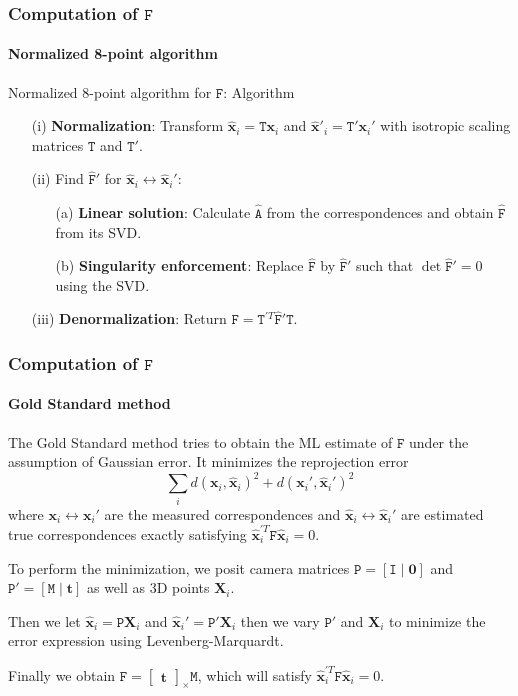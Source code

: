 \documentclass[aspectratio=169]{beamer}
\renewcommand{\vec}[1]{\boldsymbol{#1}}
\newcommand{\mat}[1]{\mathtt{#1}}
\newcommand{\crossmat}[1]{\begin{bmatrix} #1 \end{bmatrix}_{\times}}
\begin{document}
\begin{frame}
\frametitle{Computation of $\mat{F}$}
\framesubtitle{Normalized 8-point algorithm}

\begin{block}{Normalized 8-point algorithm for $\mat{F}$: Algorithm}
\begin{itemize}
\item[(i)] {\bf Normalization}: Transform
  $\hat{\vec{x}}_i=\mat{T}\vec{x}_i$ and
  $\hat{\vec{x}}'_i=\mat{T}'\vec{x}_i'$ with isotropic scaling
  matrices $\mat{T}$ and $\mat{T}'$.
\item[(ii)] Find $\hat{\mat{F}}'$ for $\hat{\vec{x}}_i \leftrightarrow
  \hat{\vec{x}}_i'$:
  \begin{itemize}
  \item[(a)] {\bf Linear solution}: Calculate $\hat{\mat{A}}$ from the
    correspondences and obtain $\hat{\mat{F}}$ from its SVD.
  \item[(b)] {\bf Singularity enforcement}: Replace $\hat{\mat{F}}$ by
    $\hat{\mat{F}}'$ such that $\det \hat{\mat{F}}'=0$ using the SVD.
  \end{itemize}
\item[(iii)] {\bf Denormalization}: Return $\mat{F}=\mat{T}^{\prime
  T}\hat{\mat{F}}'\mat{T}$.
\end{itemize}
\end{block}

\end{frame}

\begin{frame}
\frametitle{Computation of $\mat{F}$}
\framesubtitle{Gold Standard method}

The Gold Standard method tries to obtain the ML estimate of $\mat{F}$
under the assumption of Gaussian error.  It minimizes the \alert{reprojection
error}
\begin{equation*}
\sum_i d(\vec{x}_i,\hat{\vec{x}}_i)^2+d(\vec{x}_i',\hat{\vec{x}}_i')^2
\end{equation*}
where $\vec{x}_i \leftrightarrow \vec{x}_i'$ are the measured
correspondences and $\hat{\vec{x}}_i \leftrightarrow \hat{\vec{x}}_i'$ are
estimated true correspondences \alert{exactly satisfying}
$\hat{\vec{x}}_i^{\prime T}\mat{F}\hat{\vec{x}}_i = 0$.

\medskip

To perform the minimization, we posit \alert{camera matrices}
$\mat{P}=[\mat{I}\mid\vec{0}]$ and $\mat{P}'=[\mat{M}\mid\vec{t}]$ as
well as \alert{3D points} $\vec{X}_i$.

\medskip

Then we let $\hat{\vec{x}}_i=\mat{P}\vec{X}_i$ and $\hat{\vec{x}}_i' =
\mat{P}'\vec{X}_i$ then we \alert{vary $\mat{P}'$ and $\vec{X}_i$} to
minimize the error expression using Levenberg-Marquardt.

\medskip

Finally we obtain $\mat{F}=\crossmat{\vec{t}}\mat{M}$, which will
satisfy $\hat{\vec{x}}_i^{\prime T}\mat{F}\hat{\vec{x}}_i=0$.

\end{frame}
\end{document}

